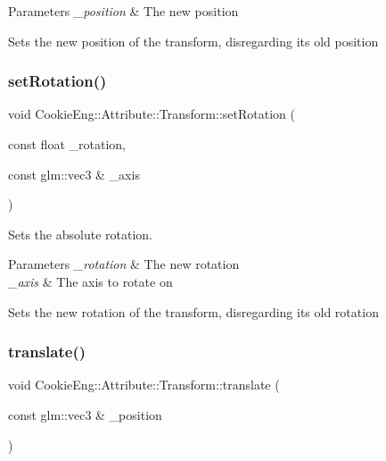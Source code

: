\begin{DoxyParams}{Parameters}
{\em \+\_\+position} & The new position\\
\hline
\end{DoxyParams}
Sets the new position of the transform, disregarding its old position \mbox{\label{class_cookie_eng_1_1_attribute_1_1_transform_a60cffb11bbd8cc354e525ad0c5880b9b}} 
\subsubsection{\texorpdfstring{set\+Rotation()}{setRotation()}}
{\footnotesize\ttfamily void Cookie\+Eng\+::\+Attribute\+::\+Transform\+::set\+Rotation (\begin{DoxyParamCaption}\item[{const float}]{\+\_\+rotation,  }\item[{const glm\+::vec3 \&}]{\+\_\+axis }\end{DoxyParamCaption})}



Sets the absolute rotation. 


\begin{DoxyParams}{Parameters}
{\em \+\_\+rotation} & The new rotation \\
\hline
{\em \+\_\+axis} & The axis to rotate on\\
\hline
\end{DoxyParams}
Sets the new rotation of the transform, disregarding its old rotation \mbox{\label{class_cookie_eng_1_1_attribute_1_1_transform_af16f4e46d6b42fc869a95e722902682c}} 
\subsubsection{\texorpdfstring{translate()}{translate()}}
{\footnotesize\ttfamily void Cookie\+Eng\+::\+Attribute\+::\+Transform\+::translate (\begin{DoxyParamCaption}\item[{const glm\+::vec3 \&}]{\+\_\+position }\end{DoxyParamCaption})}



